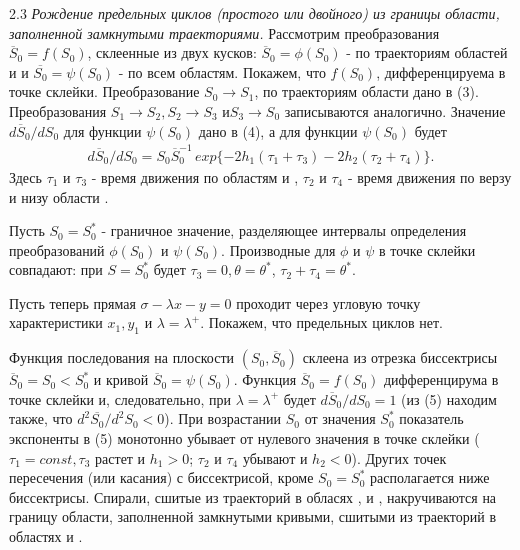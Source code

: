 \documentclass{article}
\newcommand{\RomanNumeralCaps}[1]
    {\MakeUppercase{\romannumeral #1}}
\begin{document}
2.3 \textit{Рождение предельных циклов (простого или двойного) из
границы области, заполненной замкнутыми траекториями.} Рассмотрим
преобразования $\overline{S}_{0}=f(S_{0})$, склеенные из двух кусков:
$\overline{S}_{0}= \phi(S_{0})$ - по траекториям областей \RomanNumeralCaps{1} и \RomanNumeralCaps{2} и $\overline{S_{0}}=\psi(S_{0})$ - по всем
областям. Покажем, что $f(S_{0})$, дифференцируема в точке склейки.
Преобразование $S_{0} \rightarrow S_{1}$, по траекториям области \RomanNumeralCaps{1} дано в (3).
Преобразования $S_{1} \rightarrow S_{2}, S_{2} \rightarrow S_{3}$ и$ S_{3} \rightarrow S_{0}$ записываются аналогично.
Значение $d\overline{S}_{0}/dS_{0}$ для функции $\psi(S_{0})$ дано в (4), а для 
функции $\psi(S_{0})$ будет
\begin{gather}
d\overline{S}_{0}/dS_{0} = S_{0}\overline{S}_{0}^{-1} \, exp \{-2h_{1}(\tau_{1} + \tau_{3}) - 2h_{2}(\tau_{2} + \tau_{4})\}.
\tag{5}
\end{gather}
Здесь $\tau_{1}$ и $\tau_{3}$ - время движения по областям \RomanNumeralCaps{1} и \RomanNumeralCaps{3}, $\tau_{2}$ и $\tau_{4}$ - время движения по верзу и низу области \RomanNumeralCaps{2}.

Пусть $S_{0}=S_{0}^*$ - граничное значение, разделяющее интервалы
определения преобразований $\phi(S_{0})$ и $\psi(S_{0})$. Производные для 
$\phi$ и $\psi$ в точке склейки совпадают: при $S = S_{0}^*$ будет $\tau_{3} = 0, \theta = \theta^*$,
$\tau_{2} + \tau_{4} = \theta^*$.

Пусть теперь прямая $\sigma - \lambda x - y = 0$ проходит через угловую точку характеристики $x_{1}, y_{1}$ и $\lambda = \lambda^+$. Покажем, что предельных
циклов нет.

Функция последования на плоскости $(S_{0}, \overline{S}_{0})$ склеена из отрезка
биссектрисы $\overline{S}_{0} = S_{0} < S_{0}^*$ и кривой $\overline{S}_{0} = \psi(S_{0})$. Функция
$\overline{S}_{0} = f(S_{0})$ дифференцирума в точке склейки и, следовательно,
при $\lambda = \lambda^+$ будет $d\overline{S}_{0}/dS_{0} = 1$ (из (5) находим также, что
$d^2\overline{S_{0}}/d^2S_{0}<0$). При возрастании $S_{0}$ от значения $S_{0}^*$ показатель
экспоненты в (5) монотонно убывает от нулевого значения в 
точке склейки ($\tau_{1} = const, \tau_{3}$ растет и $h_{1}>0$; $\tau_{2}$ и $\tau_{4}$ убывают
и $h_{2}<0$). Других точек пересечения (или касания) с биссектрисой,
кроме $S_{0} = S_{0}^*$ располагается ниже биссектрисы. Спирали, сшитые
из траекторий в обласях \RomanNumeralCaps{1}, \RomanNumeralCaps{2} и \RomanNumeralCaps{3}, накручиваются на границу
области, заполненной замкнутыми кривыми, сшитыми из траекторий в областях \RomanNumeralCaps{1} и \RomanNumeralCaps{2}.
\end{document}
